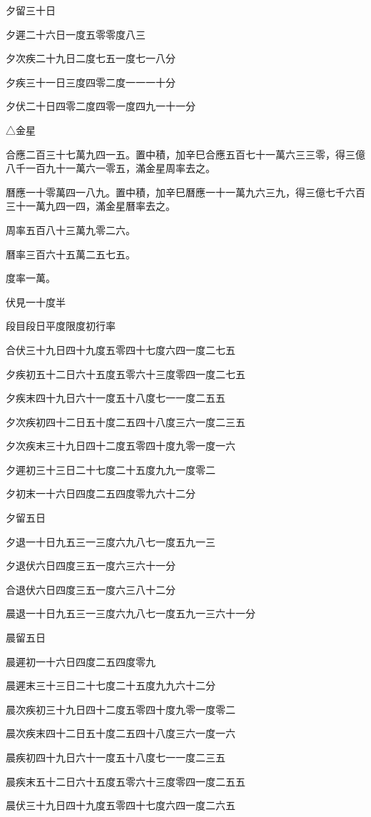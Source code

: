 夕留三十日

夕遲二十六日一度五零零度八三

夕次疾二十九日二度七五一度七一八分

夕疾三十一日三度四零二度一一一十分

夕伏二十日四零二度四零一度四九一十一分

△金星

合應二百三十七萬九四一五。置中積，加辛巳合應五百七十一萬六三三零，得三億八千一百九十一萬六一零五，滿金星周率去之。

曆應一十零萬四一八九。置中積，加辛巳曆應一十一萬九六三九，得三億七千六百三十一萬九四一四，滿金星曆率去之。

周率五百八十三萬九零二六。

曆率三百六十五萬二五七五。

度率一萬。

伏見一十度半

段目段日平度限度初行率

合伏三十九日四十九度五零四十七度六四一度二七五

夕疾初五十二日六十五度五零六十三度零四一度二七五

夕疾末四十九日六十一度五十八度七一一度二五五

夕次疾初四十二日五十度二五四十八度三六一度二三五

夕次疾末三十九日四十二度五零四十度九零一度一六

夕遲初三十三日二十七度二十五度九九一度零二

夕初末一十六日四度二五四度零九六十二分

夕留五日

夕退一十日九五三一三度六九八七一度五九一三

夕退伏六日四度三五一度六三六十一分

合退伏六日四度三五一度六三八十二分

晨退一十日九五三一三度六九八七一度五九一三六十一分

晨留五日

晨遲初一十六日四度二五四度零九

晨遲末三十三日二十七度二十五度九九六十二分

晨次疾初三十九日四十二度五零四十度九零一度零二

晨次疾末四十二日五十度二五四十八度三六一度一六

晨疾初四十九日六十一度五十八度七一一度二三五

晨疾末五十二日六十五度五零六十三度零四一度二五五

晨伏三十九日四十九度五零四十七度六四一度二六五

